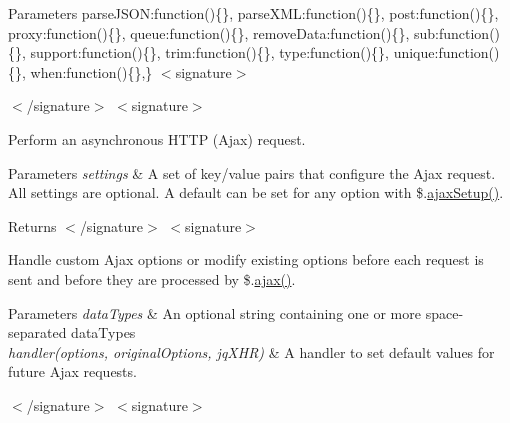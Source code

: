 \begin{DoxyParams}{Parameters}
\textquotesingle{}parse\+J\+S\+O\+N\textquotesingle{}\+:function()\{\}, \textquotesingle{}parse\+X\+M\+L\textquotesingle{}\+:function()\{\}, \textquotesingle{}post\textquotesingle{}\+:function()\{\}, \textquotesingle{}proxy\textquotesingle{}\+:function()\{\}, \textquotesingle{}queue\textquotesingle{}\+:function()\{\}, \textquotesingle{}remove\+Data\textquotesingle{}\+:function()\{\}, \textquotesingle{}sub\textquotesingle{}\+:function()\{\}, \textquotesingle{}support\textquotesingle{}\+:function()\{\}, \textquotesingle{}trim\textquotesingle{}\+:function()\{\}, \textquotesingle{}type\textquotesingle{}\+:function()\{\}, \textquotesingle{}unique\textquotesingle{}\+:function()\{\}, \textquotesingle{}when\textquotesingle{}\+:function()\{\},\} $<$signature$>$ 
 $<$/signature$>$ $<$signature$>$ \\
\hline
\end{DoxyParams}
Perform an asynchronous H\+T\+T\+P (Ajax) request.


\begin{DoxyParams}{Parameters}
{\em settings} & A set of key/value pairs that configure the Ajax request. All settings are optional. A default can be set for any option with \$.\hyperlink{obj_2_release_2_package_2_package_tmp_2_scripts_2jquery-1_810_82_8js_a52a40924d02e0d9756f051e36a640cd6}{ajax\+Setup()}.\\
\hline
\end{DoxyParams}
\begin{DoxyReturn}{Returns}
$<$/signature$>$ $<$signature$>$ 

Handle custom Ajax options or modify existing options before each request is sent and before they are processed by \$.\hyperlink{obj_2_release_2_package_2_package_tmp_2_scripts_2jquery_8validate_8js_a77004c0fdc08a5bc07afa0b099cdf6df}{ajax()}.
\end{DoxyReturn}

\begin{DoxyParams}{Parameters}
{\em data\+Types} & An optional string containing one or more space-\/separated data\+Types\\
\hline
{\em handler(options, original\+Options, jq\+X\+H\+R)} & A handler to set default values for future Ajax requests.\\
\hline
\end{DoxyParams}
$<$/signature$>$ $<$signature$>$ 

